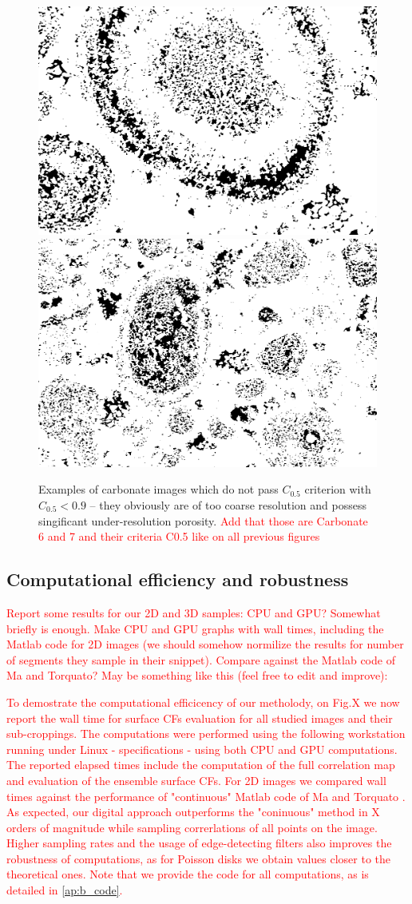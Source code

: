 \documentclass[reprint,amsmath,amssymb,aps,pre,showkeys,showpacs]{revtex4-1}
\begin{document}
\begin{figure}[t]
  \centering
  \includegraphics[width=0.475\linewidth]{images/C6-1-2-G2_019.png}
  \includegraphics[width=0.475\linewidth]{images/C6-1-2-G2_024.png}
  \caption[]{Examples of carbonate images which do not pass $C_{0.5}$ criterion
    with $C_{0.5} < 0.9$ -- they obviously are of too coarse resolution and
    possess singificant under-resolution porosity. \textcolor{red}{Add that
    those are Carbonate 6 and 7 and their criteria C0.5 like on all previous
    figures}}
  \label{fig:real-bad}
\end{figure}

\subsection{Computational efficiency and robustness}
\textcolor{red}{Report some results for our 2D and 3D samples: CPU and GPU?
  Somewhat briefly is enough. Make CPU and GPU graphs with wall times, including
  the Matlab code for 2D images (we should somehow normilize the results for
  number of segments they sample in their snippet). Compare against the Matlab
  code of Ma and Torquato? May be something like this (feel free to edit and
  improve):}

\textcolor{red}{To demostrate the computational efficicency of our metholody, on
  Fig.X we now report the wall time for surface CFs evaluation for all studied
  images and their sub-croppings. The computations were performed using the
  following workstation running under Linux - specifications - using both CPU
  and GPU computations. The reported elapsed times include the computation of
  the full correlation map and evaluation of the ensemble surface CFs. For 2D
  images we compared wall times against the performance of "continuous" Matlab
  code of Ma and Torquato \cite{ma2018SS}. As expected, our digital approach
  outperforms the "coninuous" method in X orders of magnitude while sampling
  correrlations of all points on the image. Higher sampling rates and the usage
  of edge-detecting filters also improves the robustness of computations, as for
  Poisson disks we obtain values closer to the theoretical ones. Note that we
  provide the code for all computations, as is detailed in \cref{ap:b_code}.}
\end{document}

